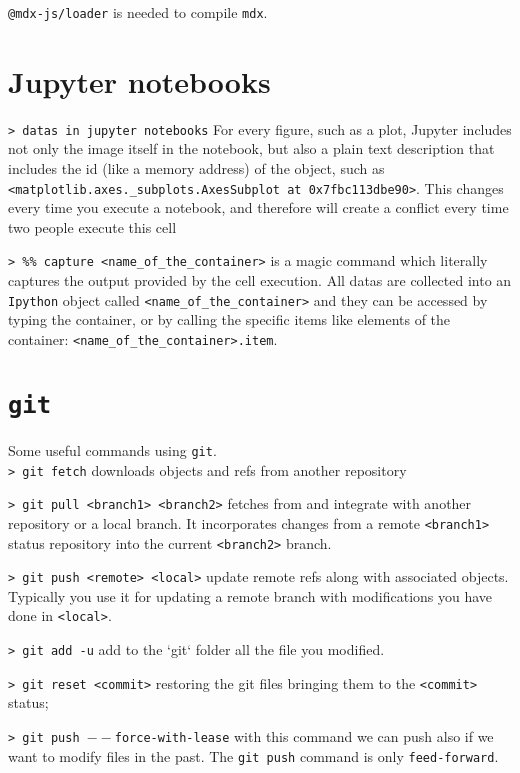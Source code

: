 \documentclass[11pt]{article}
\newcommand{\cmd}[1]{\colorbox{light-gray}{\textcolor{gio}{\texttt{#1}}}}
\begin{document}
\begin{multicols}{2}
\cmd{@mdx-js/loader} is needed to compile \texttt{mdx}.

\section{Jupyter notebooks}

\cmd{> datas in jupyter notebooks} For every figure, such as a plot, Jupyter includes not only the image itself in the notebook, but also a plain text description that includes the id (like a memory address) of the object, such as \texttt{<matplotlib.axes.\_subplots.AxesSubplot at 0x7fbc113dbe90>}. This changes every time you execute a notebook, and therefore will create a conflict every time two people execute this cell

\cmd{> \%\% capture <name\_of\_the\_container>} is a magic command which literally captures the output provided 
by the cell execution. All datas are collected into an \texttt{Ipython} object 
called \texttt{<name\_of\_the\_container>} and they can be accessed by typing the container,
or by calling the specific items like elements of the container: \texttt{<name\_of\_the\_container>.item}. 


\section{\texttt{git}}

Some useful commands using \texttt{git}. \\

\cmd{> git fetch} downloads objects and refs from another repository

\cmd{> git pull <branch1> <branch2>} fetches from and integrate with another repository or a local branch. It incorporates changes from a remote \texttt{<branch1>} status repository into the current \texttt{<branch2>} branch.

\cmd{> git push <remote> <local>} update remote refs along with associated objects. Typically you use it for updating a remote branch with modifications you have done in \texttt{<local>}.

\cmd{> git add -u} add to the `git` folder all the file you modified.

\cmd{> git reset <commit>} restoring the git files bringing them to the \texttt{<commit>} status;

\cmd{> git push $--$force-with-lease} with this command we can push also if we want to modify files in the past. The \texttt{git push} command is only \texttt{feed-forward}.


\end{multicols}
\end{document}
